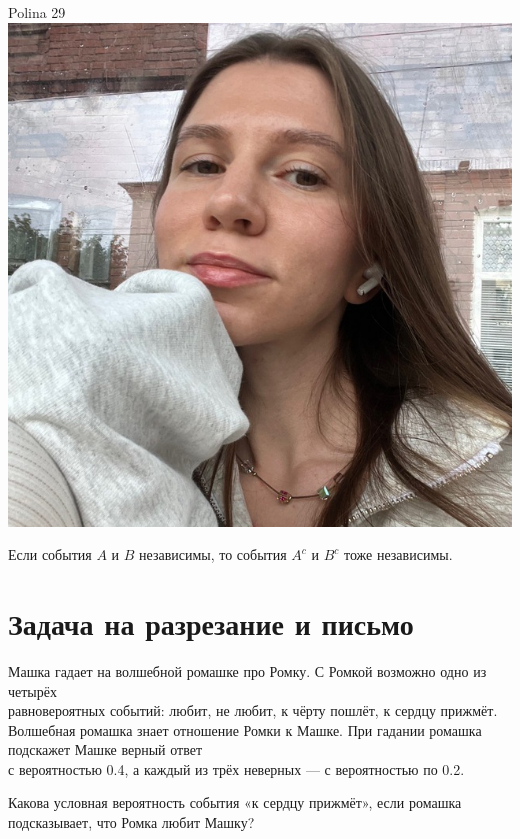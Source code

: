 \documentclass[12pt]{article}
\begin{document}
\begin{minipage}{0.45\textwidth}
\begin{tinderf}{Polina 29}
\includegraphics[width=\textwidth]{tinder-photo/polina.jpg}

  

\begin{mybox}
Если события  $A$ и $B$ независимы, то события $A^c$ и $B^c$ тоже независимы.
\end{mybox}
\end{tinderf}
\end{minipage}


\newpage


\section{Задача на разрезание и письмо}

\vspace*{1cm}

\begin{huge}
Машка гадает на волшебной ромашке про Ромку.
С Ромкой возможно одно из четырёх \\
равновероятных событий: любит, не любит, к чёрту пошлёт, к сердцу прижмёт. 
Волшебная ромашка знает отношение Ромки к Машке.
При гадании ромашка подскажет Машке верный ответ \\ 
с вероятностью 0.4, а каждый из трёх неверных — с вероятностью по 0.2. 

Какова условная вероятность события «к сердцу прижмёт»,
если ромашка подсказывает, что Ромка любит Машку?
\end{huge}
\end{document}
